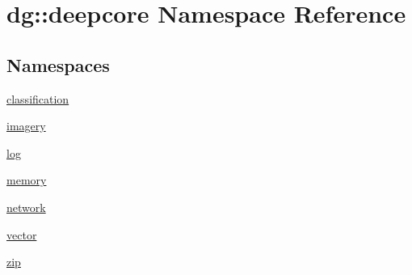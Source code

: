 \hypertarget{namespacedg_1_1deepcore}{}\section{dg\+:\+:deepcore Namespace Reference}
\label{namespacedg_1_1deepcore}
\subsection*{Namespaces}
\begin{DoxyCompactItemize}
\item 
 \hyperlink{namespacedg_1_1deepcore_1_1classification}{classification}
\item 
 \hyperlink{namespacedg_1_1deepcore_1_1imagery}{imagery}
\item 
 \hyperlink{namespacedg_1_1deepcore_1_1log}{log}
\item 
 \hyperlink{namespacedg_1_1deepcore_1_1memory}{memory}
\item 
 \hyperlink{namespacedg_1_1deepcore_1_1network}{network}
\item 
 \hyperlink{namespacedg_1_1deepcore_1_1vector}{vector}
\item 
 \hyperlink{namespacedg_1_1deepcore_1_1zip}{zip}
\end{DoxyCompactItemize}
